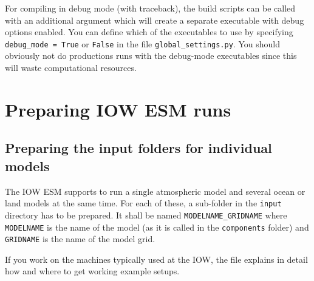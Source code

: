 \documentclass[a4paper,titlepage]{scrartcl}
\begin{document}
For compiling in debug mode (with traceback), the build scripts can be called with an additional argument which will create a separate executable with debug options enabled. You can define which of the executables to use by specifying \texttt{debug\_mode = True} or \texttt{False} in the file \texttt{global\_settings.py}. You should obviously not do productions runs with the debug-mode executables since this will waste computational resources.


\newpage
\section{Preparing IOW ESM runs}
\subsection{Preparing the input folders for individual models}
\label{sec:preparing_input_folders}

The IOW ESM supports to run a single atmospheric model and several ocean or land models at the same time.
For each of these, a sub-folder in the \texttt{input} directory has to be prepared.
It shall be named \texttt{\color{red}MODELNAME\color{black}\_\color{red}GRIDNAME} where \texttt{\color{red}MODELNAME} is the name of the model (as it is called in the \texttt{components} folder) and \texttt{\color{red}GRIDNAME} is the name of the model grid.


If you work on the machines typically used at the IOW, the \Readme file explains in detail how and where to get working example setups.
\end{document}
